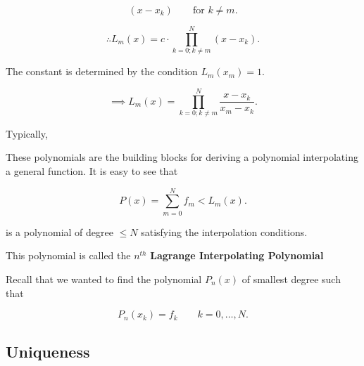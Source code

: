 \[
  (x-x_k) \qquad \text{for } k \neq m
.\]

\[
\therefore L_m(x) = c \cdot \prod_{k=0; k\neq m}^N(x-x_k)
.\]

The constant is determined by the condition $L_m(x_m) = 1$.

\[
\implies L_m(x) = \prod_{k=0; k\neq m}^{N}  \frac{x-x_k}{x_m-x_k}
.\]

Typically, 
\begin{center}
\end{center}

These polynomials are the building blocks for deriving a polynomial
interpolating a general function. It is easy to see that

\[
  P(x) = \sum_{m=0}^N f_m < L_m(x)
.\]

is a polynomial of degree $\leq N$ satisfying the interpolation conditions.

This polynomial is called the $n^{th}$ \textbf{Lagrange Interpolating Polynomial} 

Recall that we wanted to find the polynomial $P_n(x)$ of smallest degree such
that 

\[
  P_n(x_k) = f_k \qquad k = 0,\dots,N
.\]

\subsection{Uniqueness}

